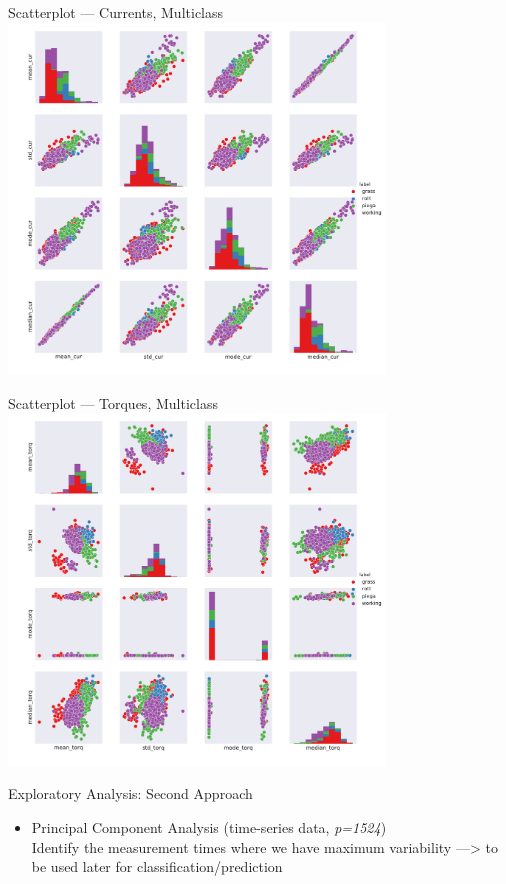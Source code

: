 \documentclass[9pt]{beamer}
\begin{document}
\begin{frame}{Scatterplot --- Currents, Multiclass}
\centering
\includegraphics[width=0.75\textwidth]{scattermatrix_currents_multi.pdf}
\end{frame}

\begin{frame}{Scatterplot --- Torques, Multiclass}
\centering
\includegraphics[width=0.75\textwidth]{scattermatrix_torques_multi.pdf}
\end{frame}

\begin{frame}{Exploratory Analysis: Second Approach}
\begin{itemize} %
\item {\large Principal Component Analysis (time-series data, \textit{p=1524})}\\
Identify the measurement times where we have maximum variability ---> to be used later for classification/prediction
\end{itemize}
\end{frame}
\end{document}
